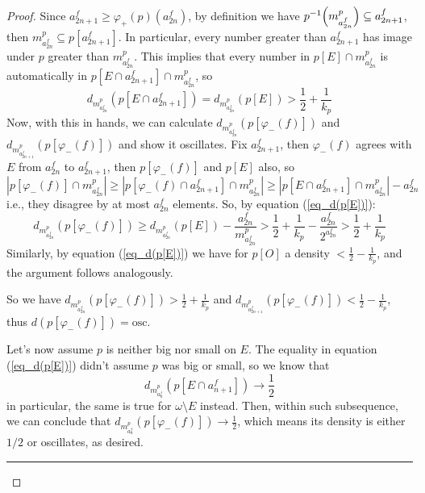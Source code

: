 \begin{proof}
    Since $a_{2n+1}^f\geq\varphi_+(p)(a_{2n}^f)$, by definition we have $p^{-1}{\left(m_{a_{2n}^f}^p\right)}\subseteq a_{2n+1}^f$, then $m_{a_{2n}^f}^p\subseteq p[a_{2n+1}^f]$. In particular, every number greater than $a_{2n+1}^f$ has image under $p$ greater than $m_{a_{2n}^f}^p$. This implies that every number in $p[E]\cap m_{a_{2n}^f}^p$ is automatically in $p[E\cap a_{2n+1}^f]\cap m_{a_{2n}^f}^p$, so
    \begin{equation}\label{eq_d(p[E])}
        d_{m_{a_{2n}^f}^p}(p[E\cap a_{2n+1}^f])=d_{m_{a_{2n}^f}^p}(p[E])>\frac12+\frac1{k_p}
    \end{equation}
    Now, with this in hands, we can calculate $d_{m_{a_{2n}^f}^p}(p[\varphi_-(f)])$ and $d_{m_{a_{2n+1}^f}^p}(p[\varphi_-(f)])$ and show it oscillates. Fix $a_{2n+1}^f$, then $\varphi_-(f)$ agrees with $E$ from $a_{2n}^f$ to $a_{2n+1}^f$, then $p[\varphi_-(f)]$ and $p[E]$ also, so
    $$\left\lvert p[\varphi_-(f)]\cap m_{a_{2n}^f}^p\right\rvert\geq\left\lvert p[\varphi_-(f)\cap a_{2n+1}^f]\cap m_{a_{2n}^f}^p\right\rvert\geq\left\lvert p[E\cap a_{2n+1}^f]\cap m_{a_{2n}^f}^p\right\rvert-a_{2n}^f$$
    i.e., they disagree by at most $a_{2n}^f$ elements. So, by equation (\ref{eq_d(p[E])}):
    $$d_{m_{a_{2n}^f}^p}(p[\varphi_-(f)])\geq d_{m_{a_{2n}^f}^p}(p[E])-\frac{a_{2n}^f}{m_{a_{2n}^f}^p}>\frac12+\frac1{k_p}-\frac{a_{2n}^f}{2^{a_{2n}^f}}>\frac12+\frac1{k_p}$$
    Similarly, by equation (\ref{eq_d(p[E])}) we have for $p[O]$ a density $<\frac12-\frac1{k_p}$, and the argument follows analogously.

    So we have $d_{m_{a_{2n}^f}^p}(p[\varphi_-(f)])>\frac12+\frac1{k_p}$ and $d_{m_{a_{2n+1}^f}^p}(p[\varphi_-(f)])<\frac12-\frac1{k_p}$, thus $d(p[\varphi_-(f)])=\text{osc}$.

    Let's now assume $p$ is neither big nor small on $E$. The equality in equation (\ref{eq_d(p[E])}) didn't assume $p$ was big or small, so we know that
    $$d_{m_{a_{n}^f}^p}(p[E\cap a_{n+1}^f])\to\frac12$$
    in particular, the same is true for $\omega\setminus E$ instead. Then, within such subsequence, we can conclude that $d_{m_{a_n^f}^p}(p[\varphi_-(f)])\to\frac12$, which means its density is either $1/2$ or oscillates, as desired.
    
    \noindent\rule{16.6cm}{0.4pt}
    

\end{proof}
